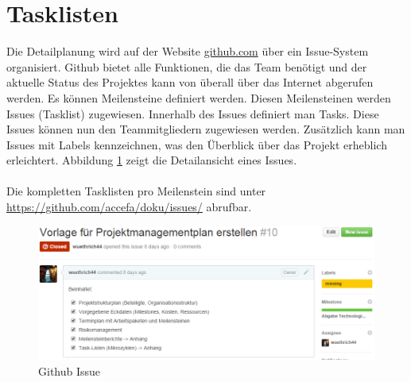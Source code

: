 \section{Tasklisten}

Die Detailplanung wird auf der Website \href{https://github.com/accefa}{github.com} über ein Issue-System organisiert. Github bietet alle Funktionen, die das Team benötigt und der aktuelle Status des Projektes kann von überall über das Internet abgerufen werden. Es können Meilensteine definiert werden. Diesen Meilensteinen werden Issues (Tasklist) zugewiesen. Innerhalb des Issues definiert man Tasks. Diese Issues können nun den Teammitgliedern zugewiesen werden. Zusätzlich kann man Issues mit Labels kennzeichnen, was den Überblick über das Projekt erheblich erleichtert. Abbildung \ref{fig:github-issue} zeigt die Detailansicht eines Issues. \\ \\
Die kompletten Tasklisten pro Meilenstein sind unter \href{https://github.com/accefa/doku/issues/}{https://github.com/accefa/doku/issues/} abrufbar.

\begin{figure}[!h]
\centering
\includegraphics[width=0.7\linewidth]{../../fig/github-issue}
\caption{Github Issue}
\label{fig:github-issue}
\end{figure}
